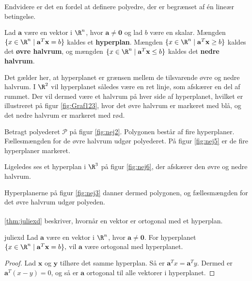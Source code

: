 Endvidere er det en fordel at definere polyedre, der er begrænset af én lineær betingelse. 
%
\begin{defn}{}{}
Lad $\mathbf{a}$ være en vektor i $\R^n$, hvor $\mathbf{a} \neq \mathbf{0}$ og lad $b$ være en skalar.
Mængden $\{x \in \R^n \mid \mathbf{a}^T \mathbf{x}=b\}$ kaldes et \textbf{hyperplan}.
%
Mængden $\{x \in \R^n \mid \mathbf{a}^T \mathbf{x} \geq b\}$ kaldes det \textbf{øvre halvrum}, og
mængden $\{x \in \R^n \mid \mathbf{a}^T \mathbf{x} \leq b\}$ kaldes det \textbf{nedre halvrum}.
\end{defn}
\noindent
%
Det gælder her, at hyperplanet er grænsen mellem de tilsvarende øvre og nedre halvrum.
I $\R^2$ vil hyperplanet således være en ret linje, som afskærer en del af rummet. 
Der vil dermed være et halvrum på hver side af hyperplanet, hvilket er illustreret på figur \ref{fig:Graf123}, hvor det øvre halvrum er markeret med blå, og det nedre halvrum er markeret med rød. 
%

%
Betragt polyederet $\mathcal{P}$ på figur \ref{fig:nej2}. 
Polygonen består af fire hyperplaner. 
Fællesmængden for de øvre halvrum udgør polyederet.
På figur \ref{fig:nej5} er de fire hyperplaner markeret. 
%
%

% 
%
%
Ligeledes ses et hyperplan i $\R^3$ på figur \ref{fig:nej6}, der afskærer den øvre og nedre halvrum.
%
%

%
%
Hyperplanerne på figur \ref{fig:nej3} danner dermed polygonen, og fællesmængden for det øvre halvrum udgør polyeden. 
\\\\
%
%
%
\ref{thm:juliexd} beskriver, hvornår en vektor er  ortogonal med et hyperplan. 
%
\begin{thm}{}{juliexd}
Lad $\mathbf{a}$ være en vektor i $\R^n$, hvor 
$\mathbf{a} \neq \mathbf{0}.$
For hyperplanet 
$\{x \in \R^n \mid \mathbf{a}^T \mathbf{x}=b\},$ 
vil $\mathbf{a}$ være ortogonal med hyperplanet.
\end{thm}
\begin{proof}
Lad $\mathbf{x}$ og $\mathbf{y}$ tilhøre det samme hyperplan. 
Så er $\mathbf{a}^Tx=\mathbf{a}^Ty.$
Dermed er $\mathbf{a}^T(x-y)=0$, og så er $\mathbf{a}$ ortogonal til alle vektorer i hyperplanet. 
\end{proof}